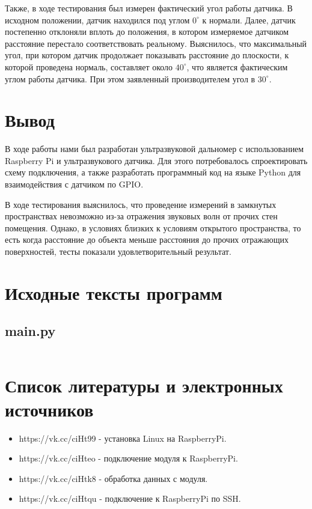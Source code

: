 \documentclass[a4paper, 14pt]{article}
\begin{document}
Также, в ходе тестирования был измерен фактический угол работы датчика. В исходном положении, датчик находился под углом $0^\circ$ к нормали. Далее, датчик постепенно отклоняли вплоть до положения, в котором измеряемое датчиком расстояние перестало соответствовать реальному. 
Выяснилось, что максимальный угол, при котором датчик продолжает показывать расстояние до плоскости, к  которой проведена нормаль, составляет около $40^\circ$, что является фактическим углом работы датчика. При этом заявленный производителем угол в $30^\circ$.
\newpage
\section{Вывод} 

В ходе работы нами был разработан ультразвуковой дальномер с использованием Raspberry Pi и ультразвукового датчика. Для этого потребовалось спроектировать схему подключения, а также разработать программный код на языке Python для взаимодействия с датчиком по GPIO.

В ходе тестирования выяснилось, что проведение измерений в замкнутых пространствах невозможно из-за отражения звуковых волн от прочих стен помещения. Однако, в условиях близких к условиям открытого пространства, то есть когда расстояние до объекта меньше расстояния до прочих отражающих поверхностей, тесты показали удовлетворительный результат.

\newpage
\section{Исходные тексты программ}

\subsection{main.py}
\normalsize
\inputminted[frame=single]{python}{../src/main.py}
\Large
\newpage
\section{Список литературы и электронных источников}

\begin{itemize}
	\item https://vk.cc/ciHt99 - установка Linux на RaspberryPi.
	\item https://vk.cc/ciHteo - подключение модуля к RaspberryPi.
	\item https://vk.cc/ciHtk8 - обработка данных с модуля.
	\item https://vk.cc/ciHtqu - подключение к RaspberryPi по SSH.
\end{itemize}
\end{document}
